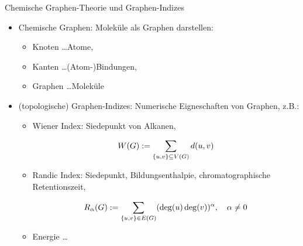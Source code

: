 \documentclass[aspectratio = 169]{beamer}
\begin{document}

\begin{frame}{Chemische Graphen-Theorie und Graphen-Indizes}

    \begin{block}{}

        \begin{itemize}

            \item Chemische Graphen: Moleküle als Graphen darstellen:
            
            \begin{itemize}
                \item Knoten  \dots Atome,
                \item Kanten  \dots (Atom-)Bindungen,
                \item Graphen \dots Moleküle
            \end{itemize}

            \item (topologische) Graphen-Indizes: Numerische Eigneschaften von Graphen, z.B.:

            \begin{itemize}
    
                \item Wiener Index: Siedepunkt von Alkanen,

                \[
                    W(G) := \sum_{{\left \{ u, v \right \}} \subseteq V(G)} d(u, v)
                \]

                \item Randic Index: Siedepunkt, Bildungsenthalpie, chromatographische Retentionszeit,


                \[
                    R_\alpha(G) := \sum_{{\left \{ u, v \right \}} \in E(G)} (\deg(u) \deg(v))^\alpha,
                    \quad
                    \alpha \neq 0
                \]

                \item Energie \dots



            \end{itemize}

        \end{itemize}

    \end{block}

\end{frame}
\end{document}
